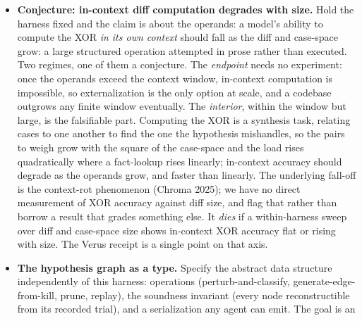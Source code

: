 \documentclass[
  10pt,
]{article}
\begin{document}
\begin{itemize}
  when its inductive step reaches past the agent; the external oracle is
  a constituent of that step, not a scaffold on it. The same pattern
  recurs across the companion posts (refutation in \emph{What Cannot Be
  False Cannot Be True}, stranger-replay in \emph{Verifiable Knowledge},
  the fold in \emph{Compress and Unfold}), which is suggestive rather
  than evidential and is kept here as a conjecture. We do not lean on it
  as a citation. It \emph{dies} if a recorded trace reaches the same
  held-out general predicate from self-authored labels only, with no
  external label, replay, human-approved reference, or environmental
  execution entering before the discriminating step; lucky guesses (no
  warrant) and already-solved cases (the difference already empty) do
  not count.
\item
  \textbf{Conjecture: in-context diff computation degrades with size.}
  Hold the harness fixed and the claim is about the operands: a model's
  ability to compute the XOR \emph{in its own context} should fall as
  the diff and case-space grow: a large structured operation attempted
  in prose rather than executed. Two regimes, one of them a conjecture.
  The \emph{endpoint} needs no experiment: once the operands exceed the
  context window, in-context computation is impossible, so
  externalization is the only option at scale, and a codebase outgrows
  any finite window eventually. The \emph{interior}, within the window
  but large, is the falsifiable part. Computing the XOR is a synthesis
  task, relating cases to one another to find the one the hypothesis
  mishandles, so the pairs to weigh grow with the square of the
  case-space and the load rises quadratically where a fact-lookup rises
  linearly; in-context accuracy should degrade as the operands grow, and
  faster than linearly. The underlying fall-off is the context-rot
  phenomenon (Chroma 2025); we have no direct measurement of XOR
  accuracy against diff size, and flag that rather than borrow a result
  that grades something else. It \emph{dies} if a within-harness sweep
  over diff and case-space size shows in-context XOR accuracy flat or
  rising with size. The Verus receipt is a single point on that axis.
\item
  \textbf{The hypothesis graph as a type.} Specify the abstract data
  structure independently of this harness: operations
  (perturb-and-classify, generate-edge-from-kill, prune, replay), the
  soundness invariant (every node reconstructible from its recorded
  trial), and a serialization any agent can emit. The goal is an

\end{itemize}
\end{document}
